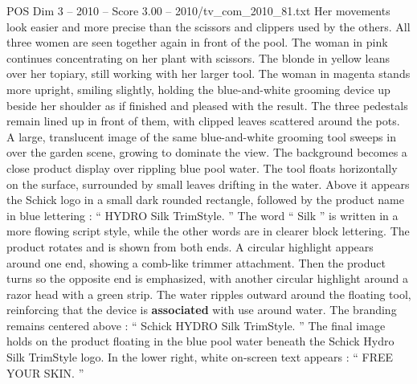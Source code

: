 \begin{textsample}{POS Dim 3 – 2010 – Score 3.00 – 2010/tv\_com\_2010\_81.txt}
Her movements look easier and more precise than the scissors and clippers used by the others.
All three women are seen together again in front of the pool.
The woman in pink continues concentrating on her plant with scissors.
The blonde in yellow leans over her topiary, still working with her larger tool.
The woman in magenta stands more upright, smiling slightly, holding the blue-and-white grooming device up beside her shoulder as if finished and pleased with the result.
The three pedestals remain lined up in front of them, with clipped leaves scattered around the pots.
A large, translucent image of the same blue-and-white grooming tool sweeps in over the garden scene, growing to dominate the view.
The background becomes a close product display over rippling blue pool water.
The tool floats horizontally on the surface, surrounded by small leaves drifting in the water.
Above it appears the Schick logo in a small dark rounded rectangle, followed by the product name in blue lettering : “ HYDRO Silk TrimStyle. ” The word “ Silk ” is written in a more flowing script style, while the other words are in clearer block lettering.
The product rotates and is shown from both ends.
A circular highlight appears around one end, showing a comb-like trimmer attachment.
Then the product turns so the opposite end is emphasized, with another circular highlight around a razor head with a green strip.
The water ripples outward around the floating tool, reinforcing that the device is \textbf{associated} with use around water.
The branding remains centered above : “ Schick HYDRO Silk TrimStyle. ” The final image holds on the product floating in the blue pool water beneath the Schick Hydro Silk TrimStyle logo.
In the lower right, white on-screen text appears : “ FREE YOUR SKIN. ”

\end{textsample}

